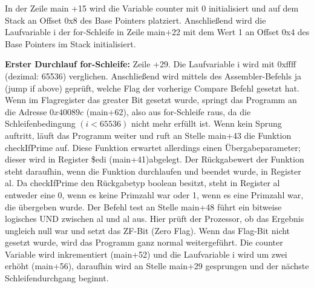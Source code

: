 \documentclass[a4paper,12pt]{article}
\begin{document}
\noindent In der Zeile main +15 wird die Variable counter mit 0 initialisiert und auf dem Stack an Offset 0x8 des Base Pointers platziert. 
Anschließend wird die Laufvariable i der for-Schleife in Zeile main+22 mit dem Wert 1 an Offset 0x4 des Base Pointers im Stack initialisiert.
\par\smallskip\noindent\textbf{Erster Durchlauf for-Schleife: } Zeile +29. Die Laufvariable i wird mit 0xffff (dezimal: 65536) verglichen. Anschließend wird mittels des Assembler-Befehls ja (jump if above) geprüft, welche Flag der vorherige Compare Befehl gesetzt hat. Wenn im Flagregister das greater Bit gesetzt wurde, springt das Programm an die Adresse $0x40089c$ (main+62), also aus for-Schleife raus, da die Schleifenbedingung $(i<65536)$ nicht mehr erfüllt ist. Wenn kein Sprung auftritt, läuft das Programm weiter und ruft an Stelle main+43 die Funktion checkIfPrime auf. Diese Funktion erwartet allerdings einen Übergabeparameter; dieser wird in Register \$edi (main+41)abgelegt. 
Der Rückgabewert der Funktion steht daraufhin, wenn die Funktion durchlaufen und beendet wurde, in Register al. Da checkIfPrime den Rückgabetyp boolean besitzt, steht in Register al entweder eine 0, wenn es keine Primzahl war oder 1, wenn es eine Primzahl war, die übergeben wurde. Der Befehl test an Stelle main+48 führt ein bitweise logisches UND zwischen al und al aus. Hier prüft der Prozessor, ob das Ergebnis ungleich null war und setzt das ZF-Bit (Zero Flag). Wenn das Flag-Bit nicht gesetzt wurde, wird das Programm ganz normal weitergeführt. Die counter Variable wird inkrementiert (main+52) und die Laufvariable i wird um zwei erhöht (main+56), daraufhin wird an Stelle main+29 gesprungen und der nächste Schleifendurchgang beginnt.
\end{document}
